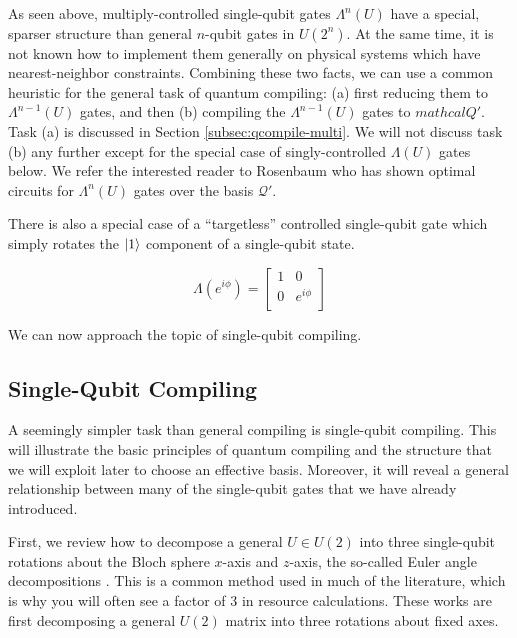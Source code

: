 As seen above, multiply-controlled single-qubit gates $\Lambda^n(U)$ have a
special, sparser structure than general $n$-qubit gates in $U(2^n)$. At the
same time, it is not known how to implement them generally on physical systems
which have nearest-neighbor constraints. Combining these two facts, we can
use a common heuristic for the general task of quantum compiling:
(a) first reducing them to $\Lambda^{n-1}(U)$ gates, and then (b) compiling
the $\Lambda^{n-1}(U)$ gates to $mathcal{Q}'$.
Task (a) is discussed in Section \ref{subsec:qcompile-multi}.
We will not discuss task (b) any further except for the special case of
singly-controlled $\Lambda(U)$ gates below. We refer the
interested reader to Rosenbaum \cite{Rosenbaum2012} who has shown
optimal circuits for $\Lambda^n(U)$ gates over the basis $\mathcal{Q}'$.

There is also a special case of a ``targetless'' controlled single-qubit
gate which simply rotates the $\left\vert{1}\right\rangle$ component of a single-qubit state.

\begin{equation}
\Lambda(e^{i\phi}) = 
 \left[
  \begin{array}{cc}
    1 & 0 \\
    0 & e^{i\phi} \\
  \end{array} \right]
\end{equation}

We can now approach the topic of single-qubit compiling.

\subsection{Single-Qubit Compiling}
\label{subsec:qcompile-single}

A seemingly simpler task than general compiling is single-qubit compiling.
This will illustrate the basic principles of quantum compiling and the
structure that we will exploit later to choose an effective basis. Moreover,
it will reveal a general relationship between many of the single-qubit
gates that we have already introduced.

First, we review how to decompose a general $U \in U(2)$ into three single-qubit
rotations about the Bloch sphere $x$-axis and $z$-axis, the so-called
Euler angle decompositions \cite{Nielsen2000}. This is a common method used
in much of the literature, which is why you will often see a factor of $3$
in resource calculations. These works are first decomposing a general
$U(2)$ matrix into three rotations about fixed axes.

